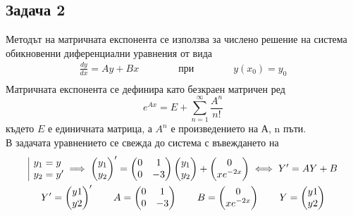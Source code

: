 \documentclass[a4paper,fleqn,12pt]{article}
\begin{document}
\newpage
\subsection{Задача 2}
Методът на матричната експонента се използва за числено решение на система обикновенни диференциални уравнения от вида 
	\begin{gather*}
		\frac{dy}{dx} = Ay + Bx
		\qquad \qquad  \text{при} \qquad \qquad 
      		y(x_0)=y_0 \\
	\end{gather*}
Матричната експонента се дефинира като безкраен матричен ред
\begin{equation*}
	e^{Ax} = E + \sum_{n=1} ^{\infty} \frac{A^n}{n!}
\end{equation*}
където $E$ е единичната матрица, а $A^n$ е произведението на А, n пъти.\\
В задачата уравнението се свежда до система с въвеждането на 
	\begin{gather*}
		\begin{array}{|l@{}}
			y_1=y\\
			y_2=y'
		\end{array} \implies 
		\begin{pmatrix} y_1 \\ y_2 \end{pmatrix}' = 
		\begin{pmatrix} 0 & 1 \\ 0 & -3 \end{pmatrix} 
		\begin{pmatrix} y_1 \\ y_2 \end{pmatrix} + 
		\begin{pmatrix} 0 \\ xe^{-2x} \end{pmatrix} \iff Y'=AY+B\\ 
		Y'=\begin{pmatrix} y1 \\ y2 \end{pmatrix}' \qquad 
		A=\begin{pmatrix} 0 & 1 \\ 0 & -3 \end{pmatrix} \qquad 
		B=\begin{pmatrix} 0 \\ xe^{-2x} \end{pmatrix} \qquad
		Y=\begin{pmatrix} y1 \\ y2 \end{pmatrix}
	\end{gather*}
\end{document}

